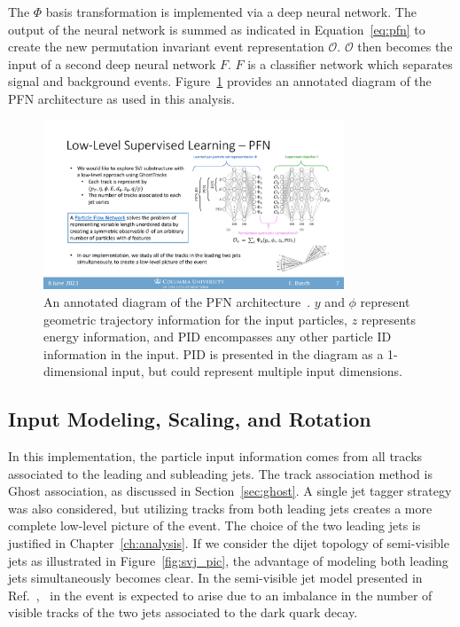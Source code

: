 The $\Phi$ basis transformation is implemented via a deep neural network. The output of the neural network is summed as indicated in Equation~\ref{eq:pfn} to create the new permutation invariant event representation $\mathcal{O}$. $\mathcal{O}$ then becomes the input of a second deep neural network $F$. $F$ is a classifier network which separates signal and background events. Figure~\ref{fig:pfn_arch} provides an annotated diagram of the PFN architecture as used in this analysis. 
\begin{figure}[!htbp]
\centering
   \includegraphics[width=0.8\textwidth]{figures/ml/pfn_arch}
    \caption{An annotated diagram of the PFN architecture~\cite{pfn}. $y$ and $\phi$ represent geometric trajectory information for the input particles, $z$ represents energy information, and PID encompasses any other particle ID information in the input. PID is presented in the diagram as a 1-dimensional input, but could represent multiple input dimensions.
        \label{fig:pfn_arch}}
\end{figure}

\subsection{Input Modeling, Scaling, and Rotation}
\label{sec:input_model}
In this implementation, the particle input information comes from all tracks associated to the leading and subleading jets. The track association method is Ghost association, as discussed in Section~\ref{sec:ghost}. A single jet tagger strategy was also considered, but utilizing tracks from both leading jets creates a more complete low-level picture of the event. The choice of the two leading jets is justified in Chapter~\ref{ch:analysis}. If we consider the dijet topology of semi-visible jets as illustrated in Figure~\ref{fig:svj_pic}, the advantage of modeling both leading jets simultaneously becomes clear. In the semi-visible jet model presented in Ref.~\cite{darkqcd}, \met~in the event is expected to arise due to an imbalance in the number of visible tracks of the two jets associated to the dark quark decay.\par

